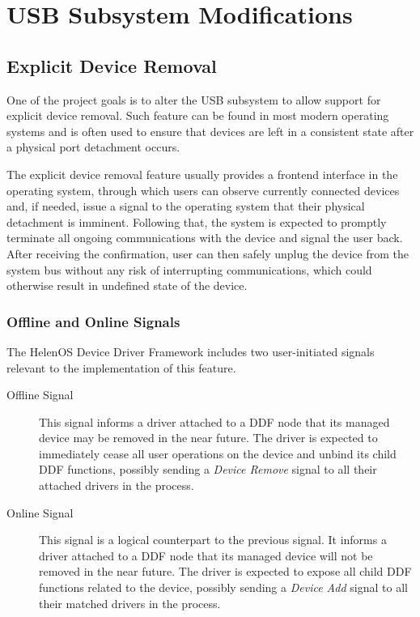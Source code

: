 \chapter{USB Subsystem Modifications}
\label{usb-refactoring}


\section{Explicit Device Removal}
One of the project goals is to alter the USB subsystem to allow support for explicit device removal.
Such feature can be found in most modern operating systems and is often used to ensure that devices are left in a consistent state after a physical port detachment occurs.

The explicit device removal feature usually provides a frontend interface in the operating system, through which users can observe currently connected devices and, if needed, issue a signal to the operating system that their physical detachment is imminent.
Following that, the system is expected to promptly terminate all ongoing communications with the device and signal the user back.
After receiving the confirmation, user can then safely unplug the device from the system bus without any risk of interrupting communications, which could otherwise result in undefined state of the device.


\subsection{Offline and Online Signals}
The HelenOS Device Driver Framework includes two user-initiated signals relevant to the implementation of this feature.

\begin{description}
	\item[Offline Signal]
		This signal informs a driver attached to a DDF node that its managed device may be removed in the near future.
		The driver is expected to immediately cease all user operations on the device and unbind its child DDF functions, possibly sending a \textit{Device Remove} signal to all their attached drivers in the process.

	\item[Online Signal]
		This signal is a logical counterpart to the previous signal.
		It informs a driver attached to a DDF node that its managed device will not be removed in the near future.
		The driver is expected to expose all child DDF functions related to the device, possibly sending a \textit{Device Add} signal to all their matched drivers in the process.
\end{description}

